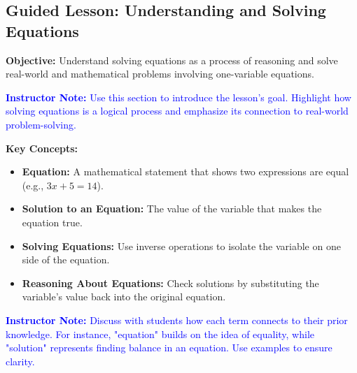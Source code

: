 \documentclass[12pt]{article}
\title{}
\date{}
\begin{document}
\subsection*{Guided Lesson: Understanding and Solving Equations}
\onehalfspacing

\begin{tcolorbox}[colframe=black!40, colback=gray!5, 
coltitle=black, colbacktitle=black!20, fonttitle=\bfseries\Large, 
title=Learning Objective, halign title=center, left=5pt, right=5pt, top=5pt, bottom=15pt]
\textbf{Objective:} Understand solving equations as a process of reasoning and solve real-world and mathematical problems involving one-variable equations.

\textcolor{blue}{\textbf{Instructor Note:} Use this section to introduce the lesson's goal. Highlight how solving equations is a logical process and emphasize its connection to real-world problem-solving.}
\end{tcolorbox}

\begin{tcolorbox}[colframe=black!60, colback=white, 
coltitle=black, colbacktitle=black!15, fonttitle=\bfseries\Large, 
title=Key Concepts and Vocabulary, halign title=center, left=10pt, right=10pt, top=10pt, bottom=15pt]
\textbf{Key Concepts:}
\begin{itemize}
    \item \textbf{Equation:} A mathematical statement that shows two expressions are equal (e.g., \( 3x + 5 = 14 \)).
    \item \textbf{Solution to an Equation:} The value of the variable that makes the equation true.
    \item \textbf{Solving Equations:} Use inverse operations to isolate the variable on one side of the equation.
    \item \textbf{Reasoning About Equations:} Check solutions by substituting the variable's value back into the original equation.
\end{itemize}

\textcolor{blue}{\textbf{Instructor Note:} Discuss with students how each term connects to their prior knowledge. For instance, "equation" builds on the idea of equality, while "solution" represents finding balance in an equation. Use examples to ensure clarity.}
\end{tcolorbox}
\end{document}
